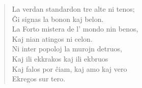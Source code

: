 \begin{verse}
                   La verdan standardon tre alte ni tenos;\\
                \^Gi signas la bonon kaj belon.\\
                La Forto mistera de l' mondo nin benos,\\
                Kaj nian atingos ni celon.\\
                Ni inter popoloj la murojn detruos,\\
                Kaj ili ekkrakos kaj ili ekbruos\\
                Kaj falos por \^ciam, kaj amo kaj vero\\
                Ekregos sur tero.

\end{verse}
